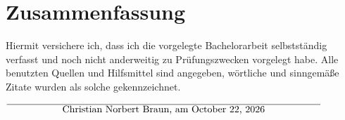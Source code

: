 \documentclass[12pt,oneside,a4paper,parskip]{scrbook}
\def\BaAuthor{Christian Norbert Braun}
\begin{document}
\chapter{Zusammenfassung}


\backmatter

\listoffigures
{}			

\listoftables


\printbibliography
{}				



Hiermit versichere ich, dass ich die vorgelegte Bachelorarbeit selbstständig verfasst und noch nicht anderweitig zu Prüfungszwecken vorgelegt habe. Alle benutzten Quellen und Hilfsmittel sind angegeben, wörtliche und sinngemäße Zitate wurden als solche gekennzeichnet.

\vspace{20pt}
\begin{flushright}
$\overline{~~~~~~~~~~~~~~~~~\mbox{\BaAuthor, am \today}~~~~~~~~~~~~~~~~~}$
\end{flushright}
\end{document}
